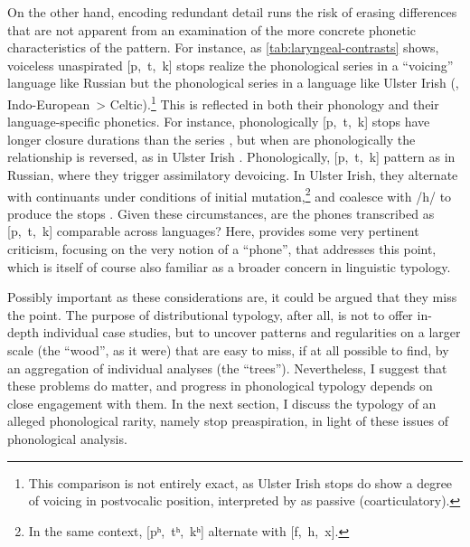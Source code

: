 \documentclass[output=paper,colorlinks,citecolor=brown]{langscibook}
\begin{document}
On the other hand, encoding redundant detail runs the risk of erasing differences that are not apparent from an examination of the more concrete phonetic characteristics of the pattern. For instance, as \cref{tab:laryngeal-contrasts} shows, voiceless unaspirated [p,~t,~k] stops realize the phonological {\VOICELESS} series in a \enquote{voicing} language like Russian but the phonological {\VOICED} series in a language like Ulster Irish (, Indo\hyp European~> Celtic).\footnote{This comparison is not entirely exact, as Ulster Irish {\VOICED} stops do show a degree of voicing in postvocalic position, interpreted by \textcite{nichasaide1986preaspiration} as passive (coarticulatory).} This is reflected in both their phonology and their language\hyp specific phonetics. For instance, phonologically {\VOICELESS} [p,~t,~k] stops have longer closure durations than the {\VOICED} series \parencite[for Russian, see e.\,g.][]{ringen2012voicing}, but when \ipa{[p,~t,~k]} are phonologically {\VOICED} the relationship is reversed, as in Ulster Irish \autocite[174]{nichasaide1986preaspiration}. Phonologically, [p,~t,~k] pattern as {\VOICELESS} in Russian, where they trigger assimilatory devoicing. In Ulster Irish, they alternate with {\VOICED} continuants under conditions of initial mutation,\footnote{In the same context, {\VOICELESS} [pʰ,~tʰ,~kʰ] alternate with {\VOICELESS} [f,~h,~x].} and coalesce with /h/ to produce the {\VOICELESS} stops \parencite{buachalla85:_moder_irish}. Given these circumstances, are the phones transcribed as [p,~t,~k] comparable across languages? Here, \textcite{Ladd_2014} provides some very pertinent criticism, focusing on the very notion of a \enquote{phone}, that addresses this point, which is itself of course also familiar as a broader concern in linguistic typology.

Possibly important as these considerations are, it could be argued that they miss the point. The purpose of distributional typology, after all, is not to offer in-depth individual case studies, but to uncover patterns and regularities on a larger scale (the \enquote{wood}, as it were) that are easy to miss, if at all possible to find, by an aggregation of individual analyses (the \enquote{trees}). Nevertheless, I suggest that these problems do matter, and progress in phonological typology depends on close engagement with them. In the next section, I discuss the typology of an alleged phonological rarity, namely {\VOICELESS} stop preaspiration, in light of these issues of phonological analysis.
\end{document}
